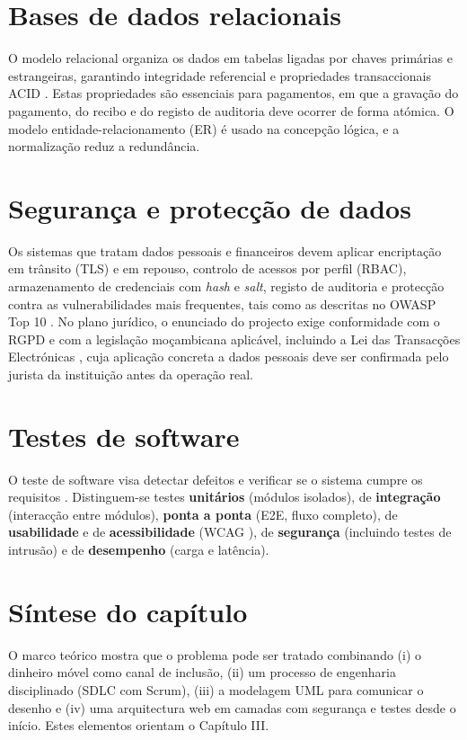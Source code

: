 \documentclass[12pt,a4paper,openany]{report}
\begin{document}
\section{Bases de dados relacionais}
O modelo relacional organiza os dados em tabelas ligadas por chaves primárias e estrangeiras, garantindo integridade referencial e propriedades transaccionais ACID \cite{elmasri2016}. Estas propriedades são essenciais para pagamentos, em que a gravação do pagamento, do recibo e do registo de auditoria deve ocorrer de forma atómica. O modelo entidade-relacionamento (ER) é usado na concepção lógica, e a normalização reduz a redundância.

\section{Segurança e protecção de dados}
Os sistemas que tratam dados pessoais e financeiros devem aplicar encriptação em trânsito (TLS) e em repouso, controlo de acessos por perfil (RBAC), armazenamento de credenciais com \emph{hash} e \emph{salt}, registo de auditoria e protecção contra as vulnerabilidades mais frequentes, tais como as descritas no OWASP Top 10 \cite{owasp2021}. No plano jurídico, o enunciado do projecto exige conformidade com o RGPD \cite{rgpd2016} e com a legislação moçambicana aplicável, incluindo a Lei das Transacções Electrónicas \cite{lei2017}, cuja aplicação concreta a dados pessoais deve ser confirmada pelo jurista da instituição antes da operação real.

\section{Testes de software}
O teste de software visa detectar defeitos e verificar se o sistema cumpre os requisitos \cite{myers2011}. Distinguem-se testes \textbf{unitários} (módulos isolados), de \textbf{integração} (interacção entre módulos), \textbf{ponta a ponta} (E2E, fluxo completo), de \textbf{usabilidade} \cite{nielsen1993} e de \textbf{acessibilidade} (WCAG \cite{wcag2018}), de \textbf{segurança} (incluindo testes de intrusão) e de \textbf{desempenho} (carga e latência).

\section{Síntese do capítulo}
O marco teórico mostra que o problema pode ser tratado combinando (i) o dinheiro móvel como canal de inclusão, (ii) um processo de engenharia disciplinado (SDLC com Scrum), (iii) a modelagem UML para comunicar o desenho e (iv) uma arquitectura web em camadas com segurança e testes desde o início. Estes elementos orientam o Capítulo III.
\end{document}
